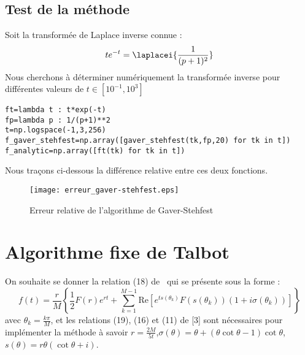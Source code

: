 \subsection*{Test de la méthode}
Soit la transformée de Laplace inverse connue :
\[
    te^{-t}=\laplacei{\dfrac{1}{(p+1)^2}}
\]
Nous cherchons à déterminer numériquement la transformée inverse 
pour différentes valeurs de $t\in[10^{-1},10^3]$  
\begin{verbatim}
ft=lambda t : t*exp(-t)
fp=lambda p : 1/(p+1)**2
t=np.logspace(-1,3,256)
f_gaver_stehfest=np.array([gaver_stehfest(tk,fp,20) for tk in t])
f_analytic=np.array([ft(tk) for tk in t])
\end{verbatim}
Nous traçons ci-dessous la différence relative entre ces deux fonctions.
\begin{figure}[!b]
    \centering
    \texttt{[image: erreur\_gaver-stehfest.eps]}
    \caption{Erreur relative de l'algorithme de Gaver-Stehfest} 
\end{figure}
\clearpage
\section{Algorithme fixe de Talbot}
On souhaite se donner la relation (18) de~\cite{abate2004} 
qui se présente sous la forme :
\[
f(t) = \dfrac{r}{M} 
\left\{ 
    \dfrac{1}{2} F(r) e^{rt}+ \sum_{k=1}^{M-1} 
    \textrm{Re}\left[ e^{ts(\theta_k)} F(s(\theta_k)) (1+i\sigma(\theta_k))\right]
\right\}
\]
avec $\theta_k=\frac{k\pi}{M}$, et les relations (19), (16) et (11) de [3] 
sont nécessaires pour implémenter la méthode à savoir 
$r=\frac{2M}{5t}$,$\sigma(\theta)=\theta+(\theta\cot\theta-1)\cot\theta$,
$s(\theta)=r\theta(\cot\theta+i)$.
\inputminted{python}{codes/python/talbot-annexe_invL.py}
